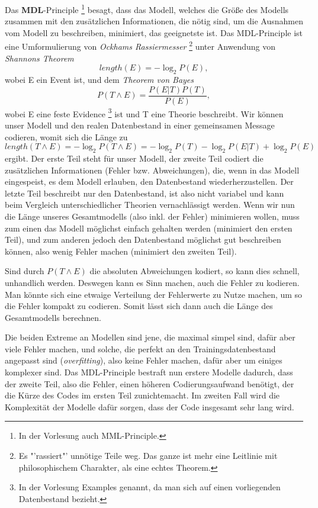 Das \textbf{MDL}-Principle
\footnote{In der Vorlesung auch MML-Principle.}
besagt, dass das Modell, welches die Größe des Modells zusammen mit den
zusätzlichen Informationen, die nötig sind, um die Ausnahmen vom Modell
zu beschreiben, minimiert, das geeignetste ist.
Das MDL-Principle ist eine 
Umformulierung von \textit{Ockhams Rassiermesser}
\footnote{Es "'rassiert"' unnötige Teile weg. Das ganze ist mehr eine Leitlinie
mit philosophischem Charakter, als eine echtes Theorem.}
unter Anwendung von \textit{Shannons Theorem}
\[
	length(E) = -\log_2 P(E),
\]
wobei E ein Event ist, und dem \textit{Theorem von Bayes} 
\[
	P(T\wedge E) = \frac{P(E|T)P(T)}{P(E)},
\]
wobei E eine feste Evidence
\footnote{In der Vorlesung Examples genannt, da man sich auf einen vorliegenden 
Datenbestand bezieht.}
ist und T eine Theorie beschreibt.
Wir können unser Modell und den realen Datenbestand in einer gemeinsamen
Message codieren, womit sich die Länge zu
\[
	length(T\wedge E) = -\log_2 P(T\wedge E) = -\log_2P(T) -\log_2 P(E|T) + \log_2P(E)
\]
ergibt. Der erste Teil steht für unser Modell, der zweite Teil codiert die 
zusätzlichen Informationen (Fehler bzw. Abweichungen),
die, wenn in das Modell eingespeist, es dem Modell
erlauben, den Datenbestand wiederherzustellen. Der letzte Teil beschreibt 
nur den Datenbestand, ist also nicht variabel und kann beim Vergleich unterschiedlicher
Theorien vernachlässigt werden. Wenn wir nun die Länge unseres Gesamtmodells (also
inkl. der Fehler) minimieren wollen, muss zum einen das Modell möglichst einfach
gehalten werden (minimiert den ersten Teil), und zum anderen jedoch den Datenbestand 
möglichst gut beschreiben können, also wenig Fehler machen (minimiert den zweiten Teil).

Sind durch \(P(T\wedge E)\) die absoluten Abweichungen kodiert, so kann dies schnell,
unhandlich werden. Deswegen kann es Sinn machen, auch die Fehler zu kodieren.
Man könnte sich eine etwaige Verteilung der Fehlerwerte zu Nutze machen, um so
die Fehler kompakt zu codieren. Somit lässt sich dann auch die Länge des Gesamtmodells
berechnen.

Die beiden Extreme an Modellen sind jene, die maximal simpel sind, dafür aber viele
Fehler machen, und solche, die perfekt an den Trainingsdatenbestand angepasst sind
(\textit{overfitting}), also keine Fehler machen, dafür aber um einiges komplexer sind.
Das MDL-Principle bestraft nun erstere Modelle dadurch, dass der zweite Teil, also
die Fehler, einen höheren Codierungsaufwand benötigt, der die Kürze des Codes im
ersten Teil zunichtemacht. Im zweiten Fall wird die Komplexität der Modelle dafür
sorgen, dass der Code insgesamt sehr lang wird.

